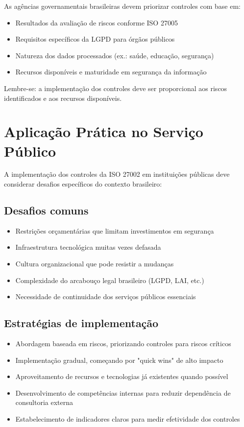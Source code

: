 \documentclass[12pt,a4paper]{report}
\begin{document}
\begin{infobox}
As agências governamentais brasileiras devem priorizar controles com base em:

\begin{itemize}
  \item Resultados da avaliação de riscos conforme ISO 27005
  \item Requisitos específicos da LGPD para órgãos públicos
  \item Natureza dos dados processados (ex.: saúde, educação, segurança)
  \item Recursos disponíveis e maturidade em segurança da informação
\end{itemize}

Lembre-se: a implementação dos controles deve ser proporcional aos riscos identificados e aos recursos disponíveis.
\end{infobox}

\section{Aplicação Prática no Serviço Público}

A implementação dos controles da ISO 27002 em instituições públicas deve considerar desafios específicos do contexto brasileiro:

\subsection{Desafios comuns}

\begin{itemize}
  \item Restrições orçamentárias que limitam investimentos em segurança
  \item Infraestrutura tecnológica muitas vezes defasada
  \item Cultura organizacional que pode resistir a mudanças
  \item Complexidade do arcabouço legal brasileiro (LGPD, LAI, etc.)
  \item Necessidade de continuidade dos serviços públicos essenciais
\end{itemize}

\subsection{Estratégias de implementação}

\begin{itemize}
  \item Abordagem baseada em riscos, priorizando controles para riscos críticos
  \item Implementação gradual, começando por "quick wins" de alto impacto
  \item Aproveitamento de recursos e tecnologias já existentes quando possível
  \item Desenvolvimento de competências internas para reduzir dependência de consultoria externa
  \item Estabelecimento de indicadores claros para medir efetividade dos controles
\end{itemize}
\end{document}
